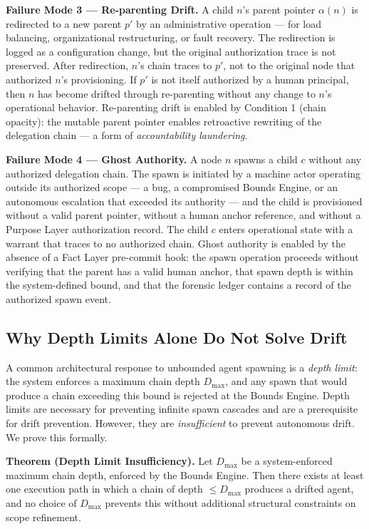 \medskip
\noindent\textbf{Failure Mode 3 — Re-parenting Drift.}
A child $n$'s parent pointer $\alpha(n)$ is redirected to a new parent $p'$ by an administrative operation — for load balancing, organizational restructuring, or fault recovery. The redirection is logged as a configuration change, but the original authorization trace is not preserved. After redirection, $n$'s chain traces to $p'$, not to the original node that authorized $n$'s provisioning. If $p'$ is not itself authorized by a human principal, then $n$ has become drifted through re-parenting without any change to $n$'s operational behavior. Re-parenting drift is enabled by Condition 1 (chain opacity): the mutable parent pointer enables retroactive rewriting of the delegation chain — a form of \emph{accountability laundering}.

\medskip
\noindent\textbf{Failure Mode 4 — Ghost Authority.}
A node $n$ spawns a child $c$ without any authorized delegation chain. The spawn is initiated by a machine actor operating outside its authorized scope — a bug, a compromised Bounds Engine, or an autonomous escalation that exceeded its authority — and the child is provisioned without a valid parent pointer, without a human anchor reference, and without a Purpose Layer authorization record. The child $c$ enters operational state with a warrant that traces to no authorized chain. Ghost authority is enabled by the absence of a Fact Layer pre-commit hook: the spawn operation proceeds without verifying that the parent has a valid human anchor, that spawn depth is within the system-defined bound, and that the forensic ledger contains a record of the authorized spawn event.

\subsection{Why Depth Limits Alone Do Not Solve Drift}
\label{sec:drift-depth-limits}

A common architectural response to unbounded agent spawning is a \emph{depth limit}: the system enforces a maximum chain depth $D_{\max}$, and any spawn that would produce a chain exceeding this bound is rejected at the Bounds Engine. Depth limits are necessary for preventing infinite spawn cascades and are a prerequisite for drift prevention. However, they are \emph{insufficient} to prevent autonomous drift. We prove this formally.

\medskip
\noindent\textbf{Theorem (Depth Limit Insufficiency).}
Let $D_{\max}$ be a system-enforced maximum chain depth, enforced by the Bounds Engine. Then there exists at least one execution path in which a chain of depth $\leq D_{\max}$ produces a drifted agent, and no choice of $D_{\max}$ prevents this without additional structural constraints on scope refinement.

